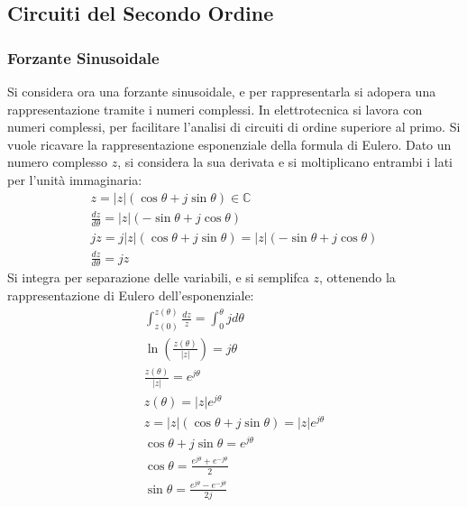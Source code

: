 \documentclass{article}
\numberwithin{equation}{subsection}
\begin{document}
\subsection{Circuiti del Secondo Ordine}

\subsubsection{Forzante Sinusoidale}

Si considera ora una forzante sinusoidale, e per rappresentarla si adopera una rappresentazione tramite i numeri complessi. 
In elettrotecnica si lavora con numeri complessi, per facilitare l'analisi di circuiti di ordine superiore al primo. 
Si vuole ricavare la rappresentazione esponenziale della formula di Eulero. 
Dato un numero complesso $z$, si considera la sua derivata e si moltiplicano entrambi i lati per l'unità immaginaria:
\begin{gather*}
    z=|z|(\cos\theta+j\sin\theta)\in\mathbb{C}\\
    \displaystyle\frac{dz}{d\theta}=|z|(-\sin\theta+j\cos\theta)\\
    jz=j|z|(\cos\theta+j\sin\theta)=|z|(-\sin\theta+j\cos\theta)\\
    \displaystyle\frac{dz}{d\theta}=jz
\end{gather*}
Si integra per separazione delle variabili, e si semplifca $z$, ottenendo la rappresentazione di Eulero dell'esponenziale: 
\begin{gather*}
    \displaystyle\int_{z(0)}^{z(\theta)}\frac{dz}{z}=\int_{0}^{\theta}jd\theta\\
    \ln\left(\displaystyle\frac{z(\theta)}{|z|}\right)=j\theta\\
    \displaystyle\frac{z(\theta)}{|z|}=e^{j\theta}\\
    z(\theta)=|z|e^{j\theta}\\
    z=|z|(\cos\theta+j\sin\theta)=|z|e^{j\theta}\\
    \cos\theta+j\sin\theta=e^{j\theta}\\
    \cos\theta=\displaystyle\frac{e^{j\theta}+e^{-j\theta}}{2}\\
    \sin\theta=\displaystyle\frac{e^{j\theta}-e^{-j\theta}}{2j}
\end{gather*}
\end{document}
